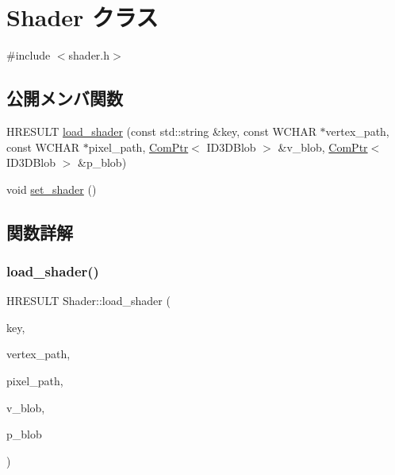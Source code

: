 \hypertarget{class_shader}{}\section{Shader クラス}
\label{class_shader}


{\ttfamily \#include $<$shader.\+h$>$}

\subsection*{公開メンバ関数}
\begin{DoxyCompactItemize}
\item 
H\+R\+E\+S\+U\+LT \mbox{\hyperlink{class_shader_a357cc3cef65b5c73f680bdebf0f08015}{load\+\_\+shader}} (const std\+::string \&key, const W\+C\+H\+AR $\ast$vertex\+\_\+path, const W\+C\+H\+AR $\ast$pixel\+\_\+path, \mbox{\hyperlink{common_8h_ab7d7d9064a34dd725663b1dbee652aca}{Com\+Ptr}}$<$ I\+D3\+D\+Blob $>$ \&v\+\_\+blob, \mbox{\hyperlink{common_8h_ab7d7d9064a34dd725663b1dbee652aca}{Com\+Ptr}}$<$ I\+D3\+D\+Blob $>$ \&p\+\_\+blob)
\item 
void \mbox{\hyperlink{class_shader_a0494397acc115e563051c5adfa3ea6db}{set\+\_\+shader}} ()
\end{DoxyCompactItemize}


\subsection{関数詳解}
\mbox{\label{class_shader_a357cc3cef65b5c73f680bdebf0f08015}} 
\subsubsection{\texorpdfstring{load\+\_\+shader()}{load\_shader()}}
{\footnotesize\ttfamily H\+R\+E\+S\+U\+LT Shader\+::load\+\_\+shader (\begin{DoxyParamCaption}\item[{const std\+::string \&}]{key,  }\item[{const W\+C\+H\+AR $\ast$}]{vertex\+\_\+path,  }\item[{const W\+C\+H\+AR $\ast$}]{pixel\+\_\+path,  }\item[{\mbox{\hyperlink{common_8h_ab7d7d9064a34dd725663b1dbee652aca}{Com\+Ptr}}$<$ I\+D3\+D\+Blob $>$ \&}]{v\+\_\+blob,  }\item[{\mbox{\hyperlink{common_8h_ab7d7d9064a34dd725663b1dbee652aca}{Com\+Ptr}}$<$ I\+D3\+D\+Blob $>$ \&}]{p\+\_\+blob }\end{DoxyParamCaption})\hspace{0.3cm}{\ttfamily [inline]}}

